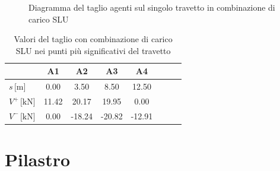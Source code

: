 \begin{landscape}
\begin{figure}[H]
	\caption{Diagramma del taglio agenti sul singolo travetto in combinazione di carico SLU}
	\label{fig:solaio_ULS_taglio}
	\end{figure}
	\begin{table}[H]
	\footnotesize
	\centering
	\caption{Valori del taglio con combinazione di carico SLU nei punti più significativi del travetto}
	\label{tab:solaio_ULS_taglio}
		\begin{tabular}{lS[table-format=-3.2]S[table-format=-3.2]S[table-format=-3.2]S[table-format=-3.2]S[table-format=-3.2]S[table-format=-3.2]S[table-format=-3.2]}
			\toprule
			{} & {A1} & {A2} & {A3}  & {A4} \\
			\midrule
			$s\,\si{[\metre]}$			 & 0.00  & 3.50 	& 8.50 	& 12.50 \\
			$V^{+}\,\si{[\kilo\newton]}$ & 11.42 & 20.17  	& 19.95  & 0.00  \\
			$V^{-}\,\si{[\kilo\newton]}$ & 0.00  & -18.24 	& -20.82 & -12.91  \\
			\bottomrule
		\end{tabular}
	\end{table}
\end{landscape}

\section{Pilastro}

